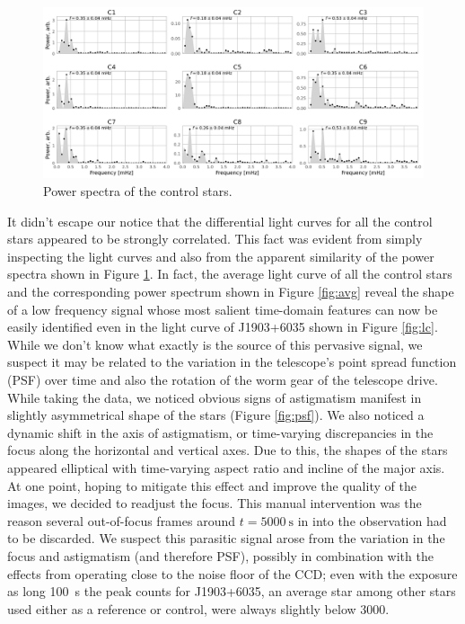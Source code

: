 \documentclass{aastex631}
\begin{document}
\begin{figure}[htbp]
\centering
\includegraphics[width=.9\linewidth]{./img/control.png}
\caption{\label{fig:control}Power spectra of the control stars.}
\end{figure}

It didn't escape our notice that the differential light curves for all
the control stars appeared to be strongly correlated. This fact was
evident from simply inspecting the light curves and also from the
apparent similarity of the power spectra shown in Figure
\ref{fig:control}. In fact, the average light curve of all the control
stars and the corresponding power spectrum shown in Figure
\ref{fig:avg} reveal the shape of a low frequency signal whose most
salient time-domain features can now be easily identified even in the
light curve of J1903+6035 shown in Figure \ref{fig:lc}. While we don't
know what exactly is the source of this pervasive signal, we suspect
it may be related to the variation in the telescope's point spread
function (PSF) over time and also the rotation of the worm gear of the
telescope drive. While taking the data, we noticed obvious signs of
astigmatism manifest in slightly asymmetrical shape of the stars
(Figure \ref{fig:psf}). We also noticed a dynamic shift in the axis of
astigmatism, or time-varying discrepancies in the focus along the
horizontal and vertical axes. Due to this, the shapes of the stars
appeared elliptical with time-varying aspect ratio and incline of the
major axis. At one point, hoping to mitigate this effect and improve
the quality of the images, we decided to readjust the focus. This
manual intervention was the reason several out-of-focus frames around
$t=\SI{5000}{\second}$ in into the observation had to be discarded. We
suspect this parasitic signal arose from the variation in the focus
and astigmatism (and therefore PSF), possibly in combination with the
effects from operating close to the noise floor of the CCD; even with
the exposure as long \SI{100}{\second} the peak counts for J1903+6035,
an average star among other stars used either as a reference or
control, were always slightly below 3000.
\end{document}
